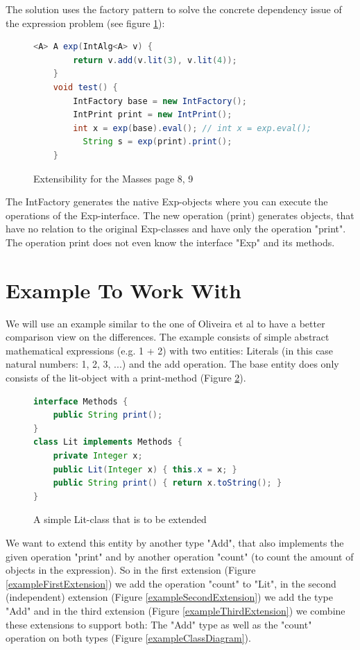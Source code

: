 \documentclass{report}
\begin{document}
The solution uses the factory pattern \cite{Gof-Design-1993} to solve the concrete dependency issue of the expression problem (see figure \ref{differentAlgebras}):

\begin{figure}[t]
\begin{lstlisting}[language=java]
    <A> A exp(IntAlg<A> v) {
        return v.add(v.lit(3), v.lit(4));
    }
    void test() {
        IntFactory base = new IntFactory();
        IntPrint print = new IntPrint();
        int x = exp(base).eval(); // int x = exp.eval();
￼￼        String s = exp(print).print();
    }
\end{lstlisting}
\caption{Extensibility for the Masses \cite{Oliv-Extensibility-2012} page 8, 9}
\label{differentAlgebras}
\end{figure}

The IntFactory generates the native Exp-objects where you can execute the operations of the Exp-interface. The new operation (print) generates objects, that have no relation to the original Exp-classes and have only the operation "print". The operation print does not even know the interface "Exp" and its methods. 

\section{Example To Work With}

We will use an example similar to the one of Oliveira et al \cite{Oliv-Extensibility-2012} to have a better comparison view on the differences. The example consists of simple abstract mathematical expressions (e.g. 1 + 2) with two entities: Literals (in this case natural numbers: 1, 2, 3, ...) and the add operation. The base entity does only consists of the lit-object with a print-method (Figure \ref{exampleLitBaseClass}).

\begin{figure}[h]
\begin{lstlisting}[language=java]
interface Methods {
    public String print();
}
class Lit implements Methods {
    private Integer x;
    public Lit(Integer x) { this.x = x; }
    public String print() { return x.toString(); }
}
\end{lstlisting}
\caption{A simple Lit-class that is to be extended}
\label{exampleLitBaseClass}
\end{figure}

We want to extend this entity by another type "Add", that also implements the given operation "print" and by another operation "count" (to count the amount of objects in the expression). So in the first extension (Figure \ref{exampleFirstExtension}) we add the operation "count" to "Lit", in the second (independent) extension (Figure \ref{exampleSecondExtension}) we add the type "Add" and in the third extension (Figure \ref{exampleThirdExtension}) we combine these extensions to support both: The "Add" type as well as the "count" operation on both types (Figure \ref{exampleClassDiagram}).
\end{document}
